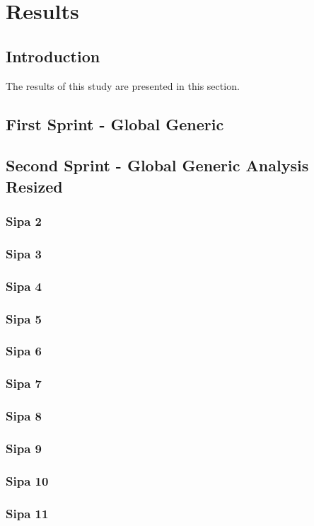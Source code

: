 \chapter{Results}
\label{chap:results}

\section{Introduction}

The results of this study are presented in this section.

\section{First Sprint - Global Generic}
\section{Second Sprint - Global Generic Analysis Resized}

\newpage

\newpage

\subsection{Sipa 2}
\subsection{Sipa 3}
\subsection{Sipa 4}
\subsection{Sipa 5}
\subsection{Sipa 6}
\subsection{Sipa 7}
\subsection{Sipa 8}
\subsection{Sipa 9}
\subsection{Sipa 10}
\subsection{Sipa 11}

